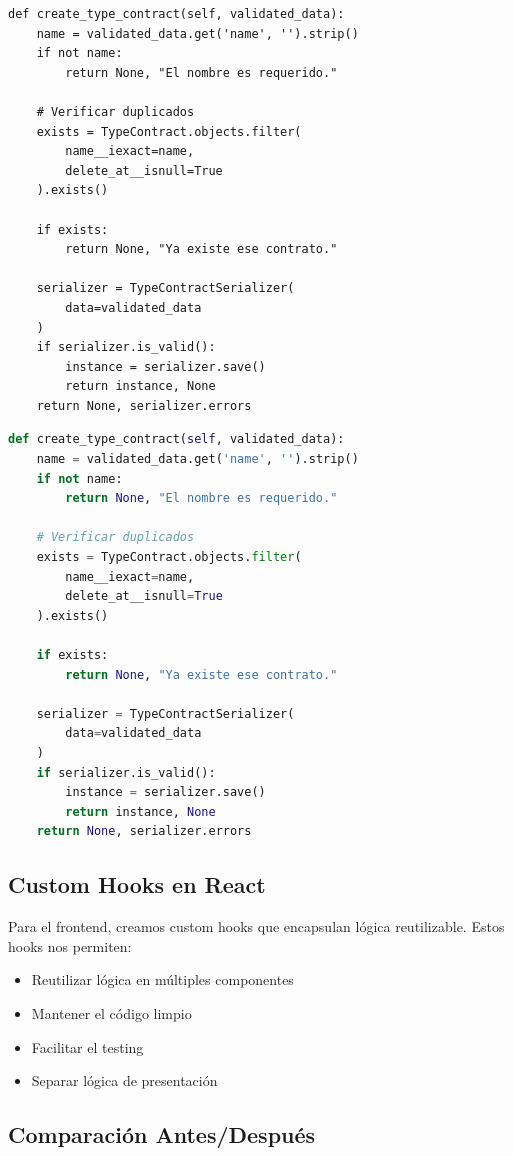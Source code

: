 \ifminted
\begin{verbatim}
def create_type_contract(self, validated_data):
    name = validated_data.get('name', '').strip()
    if not name:
        return None, "El nombre es requerido."
    
    # Verificar duplicados
    exists = TypeContract.objects.filter(
        name__iexact=name, 
        delete_at__isnull=True
    ).exists()
    
    if exists:
        return None, "Ya existe ese contrato."
    
    serializer = TypeContractSerializer(
        data=validated_data
    )
    if serializer.is_valid():
        instance = serializer.save()
        return instance, None
    return None, serializer.errors
\end{verbatim}
\else
\begin{lstlisting}[language=Python,basicstyle=\small]
def create_type_contract(self, validated_data):
    name = validated_data.get('name', '').strip()
    if not name:
        return None, "El nombre es requerido."
    
    # Verificar duplicados
    exists = TypeContract.objects.filter(
        name__iexact=name, 
        delete_at__isnull=True
    ).exists()
    
    if exists:
        return None, "Ya existe ese contrato."
    
    serializer = TypeContractSerializer(
        data=validated_data
    )
    if serializer.is_valid():
        instance = serializer.save()
        return instance, None
    return None, serializer.errors
\end{lstlisting}
\fi

\subsection{Custom Hooks en React}

Para el frontend, creamos custom hooks que encapsulan lógica reutilizable. Estos hooks nos permiten:
\begin{itemize}
    \item Reutilizar lógica en múltiples componentes
    \item Mantener el código limpio
    \item Facilitar el testing
    \item Separar lógica de presentación
\end{itemize}

\subsection{Comparación Antes/Después}

